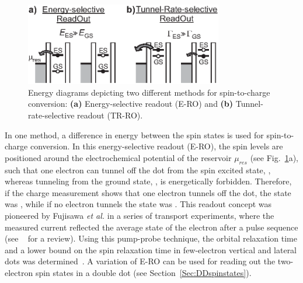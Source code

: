 \documentclass[12pt,aps,nofootinbib]{revtex4-1}
\begin{document}
\begin{figure}[htb]
\includegraphics[width=3.4in, clip=true]{hanson_fig14.eps}
\caption{Energy diagrams depicting two different methods for
spin-to-charge conversion: \textbf{(a)} Energy-selective readout
(E-RO) and \textbf{(b)} Tunnel-rate-selective readout (TR-RO).}
\label{Fig:ROdiagrams}
\end{figure}

In one method, a difference in energy between the spin states is
used for spin-to-charge conversion. In this energy-selective
readout (E-RO), the spin levels are positioned around the
electrochemical potential of the reservoir $\mu_{res}$ (see
Fig.~\ref{Fig:ROdiagrams}a), such that one electron can tunnel off
the dot from the spin excited state, , whereas tunneling
from the ground state, , is energetically forbidden.
Therefore, if the charge measurement shows that one electron
tunnels off the dot, the state was , while if no
electron tunnels the state was . This readout concept was pioneered by Fujisawa \textit{et al.} in a series of transport experiments, where the measured current reflected the average state of the electron after a pulse sequence (see ~\textcite{FujisawaRPP2006} for a review). Using this pump-probe technique, the orbital relaxation time and a lower bound on the spin relaxation time in few-electron vertical and lateral dots was determined~\cite{FujisawaPRB2001,FujisawaPhysB2001,FujisawaNature2002,HansonPRL2003}. A variation of E-RO can be used for reading out the two-electron spin states in a double dot (see Section~\ref{Sec:DDspinstates}).
\end{document}
